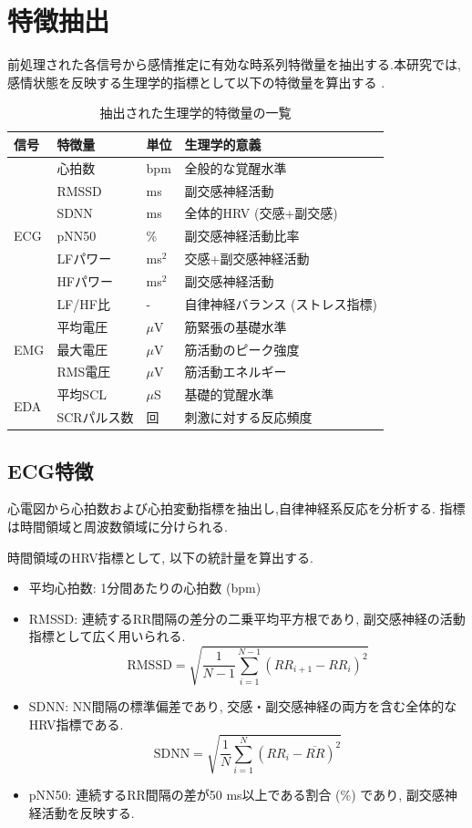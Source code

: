 \documentclass[book,paper=a4,fontsize=10pt,jafontscale=0.92]{jlreq}
\begin{document}
\section{特徴抽出}
前処理された各信号から感情推定に有効な時系列特徴量を抽出する.本研究では,感情状態を反映する生理学的指標として以下の特徴量を算出する \cite{Shu2018}.

\begin{table}[t]
\centering
\caption{抽出された生理学的特徴量の一覧}
\label{tab:features}
\begin{tabular}{llll}
\hline
信号 & 特徴量 & 単位 & 生理学的意義 \\
\hline
\multirow{7}{*}{ECG} 
& 心拍数 & bpm & 全般的な覚醒水準 \\
& RMSSD & ms & 副交感神経活動 \\
& SDNN & ms & 全体的HRV (交感+副交感) \\
& pNN50 & \% & 副交感神経活動比率 \\
& LFパワー & ms$^2$ & 交感+副交感神経活動 \\
& HFパワー & ms$^2$ & 副交感神経活動 \\
& LF/HF比 & - & 自律神経バランス (ストレス指標) \\
\hline
\multirow{3}{*}{EMG} 
& 平均電圧 & $\mu$V & 筋緊張の基礎水準 \\
& 最大電圧 & $\mu$V & 筋活動のピーク強度 \\
& RMS電圧 & $\mu$V & 筋活動エネルギー \\
\hline
\multirow{2}{*}{EDA} 
& 平均SCL & $\mu$S & 基礎的覚醒水準 \\
& SCRパルス数 & 回 & 刺激に対する反応頻度 \\
\hline
\end{tabular}
\end{table}

\subsection{ECG特徴}
心電図から心拍数および心拍変動指標を抽出し,自律神経系反応を分析する.
指標は時間領域と周波数領域に分けられる.

時間領域のHRV指標として, 以下の統計量を算出する.
\begin{itemize}
\item {平均心拍数}: 1分間あたりの心拍数 (bpm)
\item {RMSSD}: 連続するRR間隔の差分の二乗平均平方根であり, 副交感神経の活動指標として広く用いられる.
$$\mathrm{RMSSD} = \sqrt{\frac{1}{N-1} \sum_{i=1}^{N-1} (RR_{i+1} - RR_i)^2}$$
\item {SDNN}: NN間隔の標準偏差であり, 交感・副交感神経の両方を含む全体的なHRV指標である.
$$\mathrm{SDNN} = \sqrt{\frac{1}{N} \sum_{i=1}^{N} (RR_i - \overline{RR})^2}$$
\item {pNN50}: 連続するRR間隔の差が50 ms以上である割合 (\%) であり, 副交感神経活動を反映する.
\end{itemize}
\end{document}
